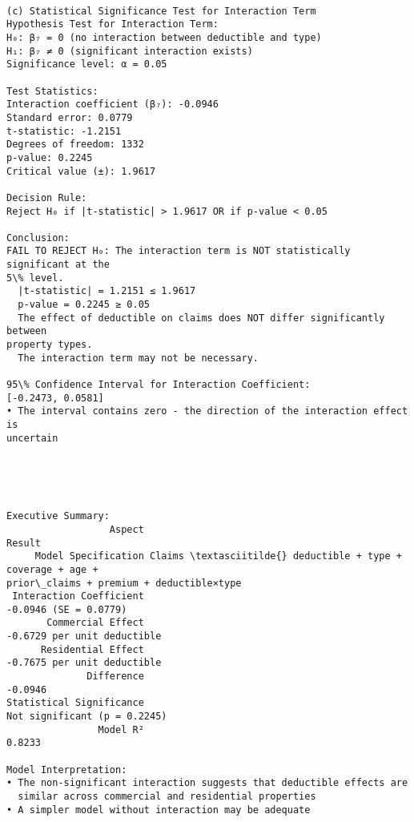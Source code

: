 \documentclass[8pt, twocolumn]{extarticle}
\begin{document}
    \begin{Verbatim}[commandchars=\\\{\}]

(c) Statistical Significance Test for Interaction Term
Hypothesis Test for Interaction Term:
H₀: β₇ = 0 (no interaction between deductible and type)
H₁: β₇ ≠ 0 (significant interaction exists)
Significance level: α = 0.05

Test Statistics:
Interaction coefficient (β₇): -0.0946
Standard error: 0.0779
t-statistic: -1.2151
Degrees of freedom: 1332
p-value: 0.2245
Critical value (±): 1.9617

Decision Rule:
Reject H₀ if |t-statistic| > 1.9617 OR if p-value < 0.05

Conclusion:
FAIL TO REJECT H₀: The interaction term is NOT statistically significant at the
5\% level.
  |t-statistic| = 1.2151 ≤ 1.9617
  p-value = 0.2245 ≥ 0.05
  The effect of deductible on claims does NOT differ significantly between
property types.
  The interaction term may not be necessary.

95\% Confidence Interval for Interaction Coefficient:
[-0.2473, 0.0581]
• The interval contains zero - the direction of the interaction effect is
uncertain
    \end{Verbatim}

    \begin{center}
    \end{center}
    { \hspace*{\fill} \\}
    
    \begin{Verbatim}[commandchars=\\\{\}]


Executive Summary:
                  Aspect
Result
     Model Specification Claims \textasciitilde{} deductible + type + coverage + age +
prior\_claims + premium + deductible×type
 Interaction Coefficient
-0.0946 (SE = 0.0779)
       Commercial Effect
-0.6729 per unit deductible
      Residential Effect
-0.7675 per unit deductible
              Difference
-0.0946
Statistical Significance
Not significant (p = 0.2245)
                Model R²
0.8233

Model Interpretation:
• The non-significant interaction suggests that deductible effects are
  similar across commercial and residential properties
• A simpler model without interaction may be adequate
    \end{Verbatim}
\end{document}
